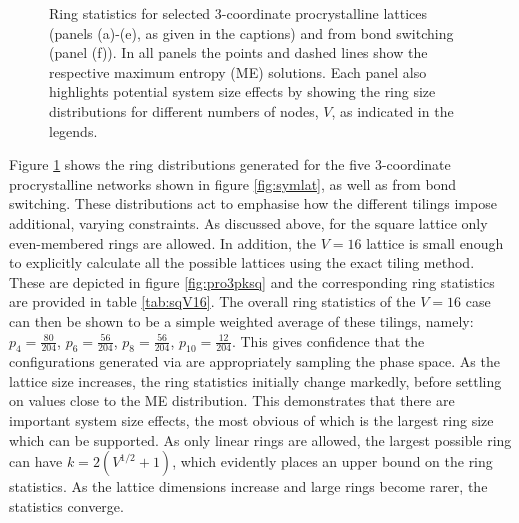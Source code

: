 \begin{figure}[btp]
     \caption{Ring statistics for selected 3\--coordinate procrystalline lattices (panels (a)\--(e), as given in the captions) and from bond switching (panel (f)). In  all  panels  the  points  and  dashed  lines show the respective maximum entropy (ME) solutions.  Each panel also highlights potential system size effects by showing the ring size distributions for different numbers of nodes, $V$, as indicated in the legends.}
     \label{fig:pro3pk}
\end{figure}

Figure \ref{fig:pro3pk} shows the ring distributions generated for the five 3\--coordinate procrystalline networks shown in figure \ref{fig:symlat}, as well as from bond switching.
These distributions act to emphasise how the different tilings impose additional, varying constraints.
As discussed above, for the square lattice only even\--membered rings are allowed.
In addition, the $V=16$ lattice is small enough to explicitly calculate all the possible lattices using the exact tiling method.
These are depicted in figure \ref{fig:pro3pksq} and the corresponding ring statistics are provided in table \ref{tab:sqV16}.
The overall ring statistics of the $V=16$ case can then be shown to be a simple weighted average of these tilings, namely: $p_4=\frac{80}{204}$, $p_6=\frac{56}{204}$, $p_8=\frac{56}{204}$, $p_{10}=\frac{12}{204}$.
This gives confidence that the configurations generated via \mc{} are appropriately sampling the phase space.
As the lattice size increases, the ring statistics initially change markedly, before settling on values close to the ME distribution.
This demonstrates that there are important system size effects, the most obvious of which is the largest ring size which can be supported.
As only linear rings are allowed, the largest possible ring can have $k=2\left(V^{1/2}+1\right)$, which evidently places an upper bound on the ring statistics.
As the lattice dimensions increase and large rings become rarer, the statistics converge.

